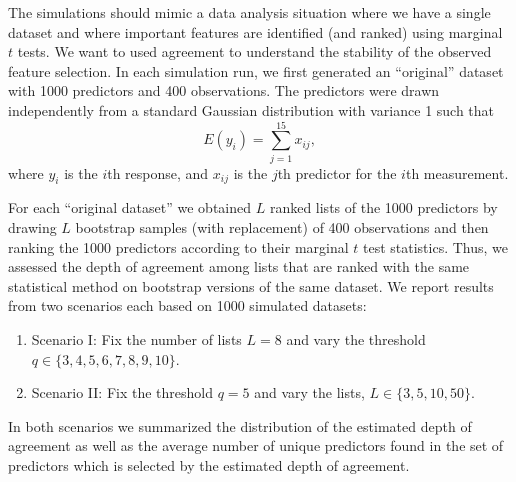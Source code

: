 \documentclass[oupdraft]{bio}
\newcommand{\added}[1]{{\color{added}{}#1}}
\begin{document}
\added{The simulations should mimic a data analysis situation where we
  have a single dataset and where important features are identified
  (and ranked) using marginal $t$ tests.  We want to used agreement to
  understand the stability of the observed feature selection.  } In
each simulation run, we first generated an ``original'' dataset with
1000 predictors and 400 observations. The predictors were drawn
independently from a standard Gaussian distribution with variance 1
such that
$$E(y_i) = \sum_{j=1}^{15}x_{ij},$$
where $y_i$ is the $i$th response, and $x_{ij}$ is the $j$th predictor
for the $i$th measurement.

For each ``original dataset'' we obtained $L$ ranked lists of the 1000
predictors by drawing $L$ bootstrap samples (with replacement) of 400
observations and then ranking the 1000 predictors according to their
marginal $t$ test statistics. Thus, we assessed the depth of agreement
among lists that are ranked with the same statistical method on
bootstrap versions of the same dataset. We report results from two
scenarios each based on 1000 simulated datasets:
\begin{enumerate}
\item[] Scenario I: Fix the number of lists \(L=8\) and vary the threshold  $q\in\{3,4,5,6,7,8,9,10\}$.
\item[] Scenario II: Fix the threshold \(q=5\) and vary the lists, $L\in\{3,5,10,50\}$.
\end{enumerate}
In both scenarios we summarized the distribution of the estimated
depth of agreement as well as the average number of unique predictors found
in the set of predictors which is selected by the estimated depth of
agreement.
\end{document}
